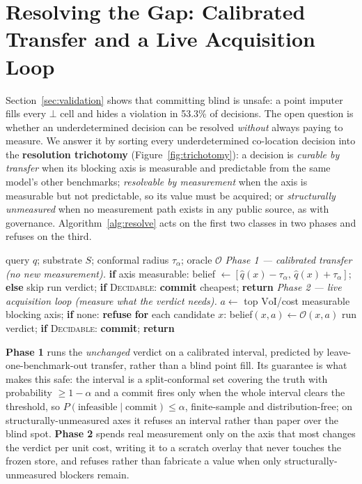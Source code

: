 \documentclass{article} %
\newcommand{\VoI}{\mathrm{VoI}}
\newcommand{\bbot}{\bot}
\begin{document}
\section{Resolving the Gap: Calibrated Transfer and a Live Acquisition Loop}\label{sec:resolve}

Section~\ref{sec:validation} shows that committing blind is unsafe: a point imputer fills every $\bbot$ cell and hides a violation in 53.3\% of decisions. The open question is whether an underdetermined decision can be resolved \emph{without} always paying to measure. We answer it by sorting every underdetermined co-location decision into the \textbf{resolution trichotomy} (Figure~\ref{fig:trichotomy}): a decision is \emph{curable by transfer} when its blocking axis is measurable and predictable from the same model's other benchmarks; \emph{resolvable by measurement} when the axis is measurable but not predictable, so its value must be acquired; or \emph{structurally unmeasured} when no measurement path exists in any public source, as with governance. Algorithm~\ref{alg:resolve} acts on the first two classes in two phases and refuses on the third.

\begin{algorithm}[H]
\caption{Selective Resolution of an underdetermined decision}\label{alg:resolve}
\begin{algorithmic}[1]
\Require query $q$; substrate $S$; conformal radius $\tau_\alpha$; oracle $\mathcal{O}$
\Statex \emph{Phase 1 --- calibrated transfer (no new measurement).}
\For{each fragmented-$\bbot$ quality cell $(x,\text{q})$ blocking $q$}
  \State \textbf{if} axis measurable: belief $\gets[\hat q(x){-}\tau_\alpha,\,\hat q(x){+}\tau_\alpha]$; \textbf{else} skip 
\EndFor
\State run verdict; \textbf{if} \textsc{Decidable}: \textbf{commit} cheapest; \textbf{return}
\Statex \emph{Phase 2 --- live acquisition loop (measure what the verdict needs).}
\Loop
  \State $a\gets$ top $\VoI$/cost measurable blocking axis; \textbf{if} none: \textbf{refuse}
  \State \textbf{for} each candidate $x$: belief$(x,a)\gets\mathcal{O}(x,a)$ 
  \State run verdict; \textbf{if} \textsc{Decidable}: \textbf{commit}; \textbf{return}
\EndLoop
\end{algorithmic}
\end{algorithm}

\textbf{Phase 1} runs the \emph{unchanged} verdict on a calibrated interval, predicted by leave-one-benchmark-out transfer, rather than a blind point fill. Its guarantee is what makes this safe: the interval is a split-conformal set covering the truth with probability $\ge 1-\alpha$ and a commit fires only when the whole interval clears the threshold, so $P(\text{infeasible}\mid\text{commit})\le\alpha$, finite-sample and distribution-free; on structurally-unmeasured axes it refuses an interval rather than paper over the blind spot. \textbf{Phase 2} spends real measurement only on the axis that most changes the verdict per unit cost, writing it to a scratch overlay that never touches the frozen store, and refuses rather than fabricate a value when only structurally-unmeasured blockers remain.
\end{document}
